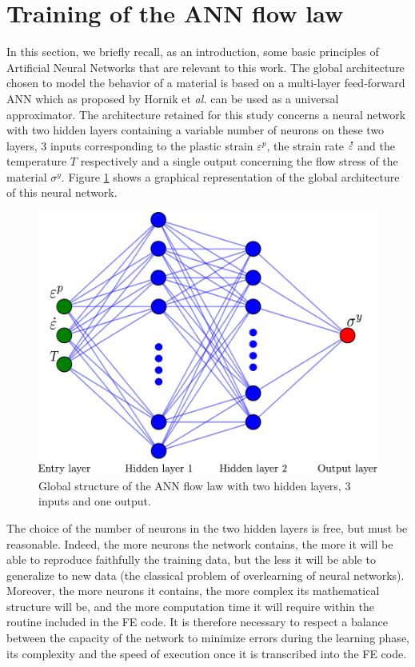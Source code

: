 \documentclass[algorithms,article,submit,pdftex,moreauthors]{Definitions/mdpi}
\makeatletter
\DeclareRobustCommand{\mdot}[1]{\accentset{\mbox{\bfseries .}}{#1}}
\DeclareRobustCommand{\eal}{et \emph{al.}\@\xspace}
\makeatother
\begin{document}
\section{Training of the ANN flow law}\label{sec:Training}

In this section, we briefly recall, as an introduction, some basic principles of Artificial Neural Networks that are relevant to this work.
The global architecture chosen to model the behavior of a material is based on a multi-layer feed-forward ANN which as proposed by Hornik \eal \cite{Hornik-1989-MFN} can be used as a universal approximator.
The architecture retained for this study concerns a neural network with two hidden layers containing a variable number of neurons on these two layers, $3$ inputs corresponding to the plastic strain $\varepsilon^p$, the strain rate $\mdot\varepsilon$ and the temperature $T$ respectively and a single output concerning the flow stress of the material $\sigma^y$.
Figure \ref{fig:ANN-scheme} shows a graphical representation of the global architecture of this neural network.
\begin{figure}[!ht]
\centering
\includegraphics[width=0.7\columnwidth]{Figures/ANN-scheme-2HL}
\caption{Global structure of the ANN flow law with two hidden layers, 3 inputs and one output.}
\label{fig:ANN-scheme}
\end{figure}
The choice of the number of neurons in the two hidden layers is free, but must be reasonable.
Indeed, the more neurons the network contains, the more it will be able to reproduce faithfully the training data, but the less it will be able to generalize to new data (the classical problem of overlearning of neural networks).
Moreover, the more neurons it contains, the more complex its mathematical structure will be, and the more computation time it will require within the routine included in the FE code.
It is therefore necessary to respect a balance between the capacity of the network to minimize errors during the learning phase, its complexity and the speed of execution once it is transcribed into the FE code.
\end{document}
